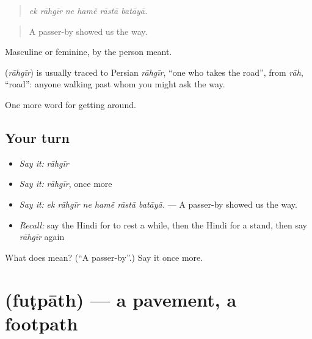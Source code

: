 \begin{quote}
     
\end{quote}

\begin{quote}
\emph{ek rāhgīr ne hamẽ rāstā batāyā.}
\end{quote}

\begin{quote}
A passer-by showed us the way.
\end{quote}

Masculine or feminine, by the person meant.

\begin{cousinweb}
\textbf{} (\emph{rāhgīr}) is usually traced to Persian \emph{rāhgīr}, \textquotedblleft{}one who takes the road\textquotedblright{}, from \emph{rāh}, \textquotedblleft{}road\textquotedblright{}: anyone walking past whom you might ask the way.
\end{cousinweb}

\begin{grammarlens}[title={What you've built}]
One more word for getting around.
\end{grammarlens}

\subsection*{Your turn}
\begin{itemize}
\raggedright
  \item \emph{Say it:} \emph{rāhgīr}
  \item \emph{Say it:} \emph{rāhgīr}, once more
  \item \emph{Say it:} \emph{ek rāhgīr ne hamẽ rāstā batāyā.} — A passer-by showed us the way.
  \item \emph{Recall:} say the Hindi for to rest a while, then the Hindi for a stand, then say \emph{rāhgīr} again
\end{itemize}

\begin{tcolorbox}[breakable,colback=teal!4,colframe=teal!35!black,title={Before you move on}]
What does  mean? (\textquotedblleft{}A passer-by\textquotedblright{}.) Say it once more.
\end{tcolorbox}
\section[\texorpdfstring{\hi{फ़ुटपाथ} (fuṭpāth)}{फ़ुटपाथ (fuṭpāth)}]{ (fuṭpāth) — a pavement, a footpath}

